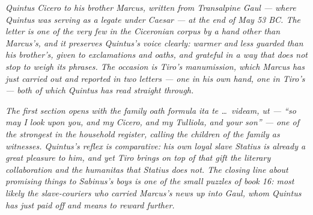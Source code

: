 
\textit{Quintus Cicero to his brother Marcus, written from
Transalpine Gaul --- where Quintus was serving as a legate
under Caesar --- at the end of May 53 BC. The letter is one
of the very few in the Ciceronian corpus by a hand other than
Marcus's, and it preserves Quintus's voice clearly: warmer
and less guarded than his brother's, given to exclamations
and oaths, and grateful in a way that does not stop to weigh
its phrases. The occasion is Tiro's manumission, which Marcus
has just carried out and reported in two letters --- one in
his own hand, one in Tiro's --- both of which Quintus has
read straight through.}

\textit{The first section opens with the family oath formula
\textit{ita te \dots\ videam, ut} --- ``so may I look upon you,
and my Cicero, and my Tulliola, and your son'' --- one of the
strongest in the household register, calling the children of
the family as witnesses. Quintus's reflex is comparative: his
own loyal slave Statius is already a great pleasure to him,
and yet Tiro brings on top of that gift the literary
collaboration and the \textit{humanitas} that Statius does
not. The closing line about promising things to Sabinus's
boys is one of the small puzzles of book 16: most likely the
slave-couriers who carried Marcus's news up into Gaul, whom
Quintus has just paid off and means to reward further.}
